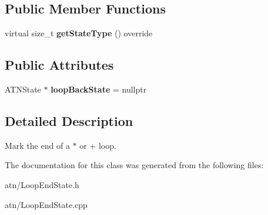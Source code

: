 \subsection*{Public Member Functions}
\begin{DoxyCompactItemize}
\item 
\mbox{\label{classantlr4_1_1atn_1_1LoopEndState_ad60063a16db0b1d7615e2c633521a834}} 
virtual size\+\_\+t {\bfseries get\+State\+Type} () override
\end{DoxyCompactItemize}
\subsection*{Public Attributes}
\begin{DoxyCompactItemize}
\item 
\mbox{\label{classantlr4_1_1atn_1_1LoopEndState_ad6c1240364ac3347aa6fe9c4417b5b21}} 
A\+T\+N\+State $\ast$ {\bfseries loop\+Back\+State} = nullptr
\end{DoxyCompactItemize}


\subsection{Detailed Description}
Mark the end of a $\ast$ or + loop. 

The documentation for this class was generated from the following files\+:\begin{DoxyCompactItemize}
\item 
atn/Loop\+End\+State.\+h\item 
atn/Loop\+End\+State.\+cpp\end{DoxyCompactItemize}
